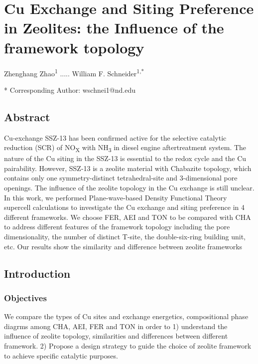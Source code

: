 \documentclass[12pt]{article}
\begin{document}
\section*{Cu Exchange and Siting Preference in Zeolites: the Influence of the framework topology}

Zhenghang Zhao\textsuperscript{1} ..... William F. Schneider\textsuperscript{1,*}

{\small
{}
* Corresponding Author: wschnei1@nd.edu 
}                     

\subsection*{Abstract}

Cu-exchange SSZ-13 has been confirmed active for the selective catalytic reduction (SCR) of NO\textsubscript{X} with NH\textsubscript{3} in diesel engine aftertreatment system. The nature of the Cu siting in the SSZ-13 is essential to the redox cycle and the Cu pairability. However, SSZ-13 is a zeolite material with Chabazite topology, which contains only one symmetry-distinct tetrahedral-site and 3-dimensional pore openings. The influence of the zeolite topology in the Cu exchange is still unclear. In this work, we performed Plane-wave-based Density Functional Theory supercell calculations to investigate the Cu exchange and siting preference in 4 different frameworks. We choose FER, AEI and TON to be compared with CHA to address different features of the framework topology including the pore dimensionality, the number of distinct T-site, the double-six-ring building unit, etc. Our results show the similarity and difference between zeolite frameworks\cite{Nobody06}

\subsection*{Introduction}
\subsubsection*{Objectives}
We compare the types of Cu sites and exchange energetics, compositional phase diagrms among CHA, AEI, FER and TON in order to 1) understand the influence of zeolite topology, similarities and differences between different framework. 2) Propose a design strategy to guide the choice of zeolite framework to achieve specific catalytic purposes.
\end{document}
